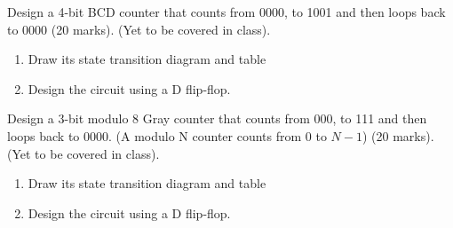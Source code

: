 \begin{prob}
  Design a 4-bit BCD counter that counts from 0000, to 1001 and then loops back
  to 0000 (20 marks).
  (Yet to be covered in class).\\
  \begin{enumerate}
  \item Draw its state transition diagram and table
  \item Design the circuit using a D flip-flop.
  \end{enumerate}
\end{prob}
\newpage

\begin{prob}
  Design a 3-bit modulo 8 Gray counter that counts from 000, to 111 and then loops back
  to 0000. (A modulo N counter counts from 0 to $N-1$) (20 marks).
  (Yet to be covered in class).\\
  \begin{enumerate}
  \item Draw its state transition diagram and table
  \item Design the circuit using a D flip-flop.
  \end{enumerate}
\end{prob}